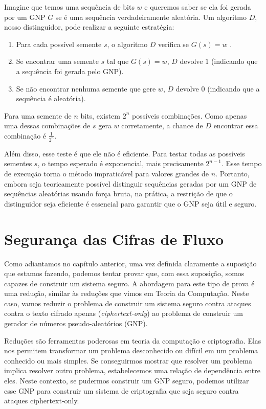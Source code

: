 Imagine que temos uma sequência de bits $w$ e queremos saber se ela foi gerada por um GNP $G$  se é uma sequência verdadeiramente aleatória.
Um algoritmo $D$, nosso distinguidor, pode realizar a seguinte estratégia:

\begin{enumerate}
    \item Para cada possível semente $s$, o algoritmo $D$ verifica se $G(s) = w$  . 
    \item Se encontrar uma semente $s$ tal que $G(s) = w$, $D$ devolve $1$ (indicando que a sequência foi gerada pelo GNP).
    \item Se não encontrar nenhuma semente que gere $w$, $D$ devolve $0$ (indicando que a sequência é aleatória).
\end{enumerate}

Para uma semente de $n$ bits, existem $2^n$ possíveis combinações.
Como apenas uma dessas combinações de $s$ gera $w$ corretamente, a chance de $D$ encontrar essa combinação é $\frac{1}{2^n}$.

Além disso, esse teste é que ele não é eficiente.
Para testar todas as possíveis sementes $s$, o tempo esperado é exponencial, mais precisamente $2^{n-1}$.
Esse tempo de execução torna o método impraticável para valores grandes de $n$.
Portanto, embora seja teoricamente possível distinguir sequências geradas por um GNP de sequências aleatórias usando força bruta, na prática, a restrição de que o distinguidor seja eficiente é essencial para garantir que o GNP seja útil e seguro.

\section{Segurança das Cifras de Fluxo}
\label{sec:streamcipher-sec}

Como adiantamos no capítulo anterior, uma vez definida claramente a suposição que estamos fazendo, podemos tentar provar que, com essa suposição, somos capazes de construir um sistema seguro.
A abordagem para este tipo de prova é uma redução, similar às reduções que vimos em Teoria da Computação.
Neste caso, vamos reduzir o problema de construir um sistema seguro contra ataques contra o texto cifrado apenas ({\em ciphertext-only}) ao problema de construir um gerador de números pseudo-aleatórios (GNP).

Reduções são ferramentas poderosas em teoria da computação e criptografia.
Elas nos permitem transformar um problema desconhecido ou difícil em um problema conhecido ou mais simples.
Se conseguirmos mostrar que resolver um problema implica resolver outro problema, estabelecemos uma relação de dependência entre eles.
Neste contexto, se pudermos construir um GNP seguro, podemos utilizar esse GNP para construir um sistema de criptografia que seja seguro contra ataques ciphertext-only.

